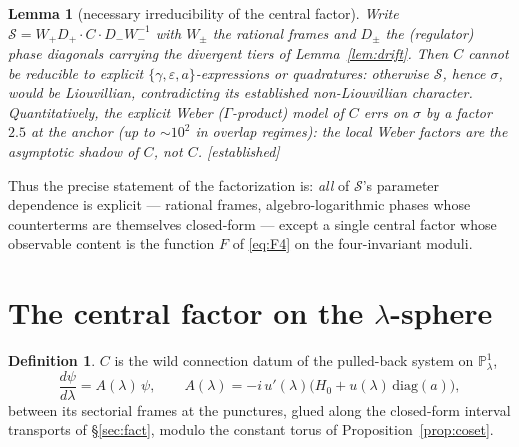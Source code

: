 \documentclass[11pt]{article}
\newtheorem{lemma}{Lemma}
\theoremstyle{definition}
\newtheorem{definition}{Definition}
\theoremstyle{remark}
\newcommand{\eps}{\varepsilon}
\newcommand{\PP}{\mathbb{P}^1}
\newcommand{\diag}{\mathrm{diag}}
\newcommand{\Scat}{\mathcal{S}}
\newcommand{\evidence}[1]{\textnormal{\small[\textit{#1}]}}
\begin{document}
\begin{lemma}[necessary irreducibility of the central factor]\label{lem:irr}
Write $\Scat=W_+D_+\cdot C\cdot D_-W_-^{-1}$ with $W_\pm$ the rational frames and
$D_\pm$ the (regulator) phase diagonals carrying the divergent tiers of
Lemma~\ref{lem:drift}. Then $C$ cannot be reducible to explicit
$\{\gamma,\eps,a\}$-expressions or quadratures: otherwise $\Scat$, hence $\sigma$, would
be Liouvillian, contradicting its established non-Liouvillian character. Quantitatively,
the explicit Weber ($\Gamma$-product) model of $C$ errs on $\sigma$ by a factor $2.5$ at
the anchor (up to $\sim10^2$ in overlap regimes): the local Weber factors are the
asymptotic shadow of $C$, not $C$. \evidence{established}
\end{lemma}

Thus the precise statement of the factorization is: \emph{all} of $\Scat$'s parameter
dependence is explicit --- rational frames, algebro-logarithmic phases whose
counterterms are themselves closed-form --- except a single central factor whose
observable content is the function $F$ of \eqref{eq:F4} on the four-invariant moduli.

\section{The central factor on the $\lambda$-sphere}\label{sec:C}

\begin{definition}\label{def:C}
$C$ is the wild connection datum \cite{Wasow1965,JMU1981} of the pulled-back system on
$\PP_\lambda$,
\begin{equation}\label{eq:lamsys}
\frac{d\psi}{d\lambda}=A(\lambda)\,\psi,\qquad
A(\lambda)=-i\,u'(\lambda)\big(H_0+u(\lambda)\,\diag(a)\big),
\end{equation}
between its sectorial frames at the punctures, glued along the closed-form interval
transports of \S\ref{sec:fact}, modulo the constant torus of
Proposition~\ref{prop:coset}.
\end{definition}
\end{document}
